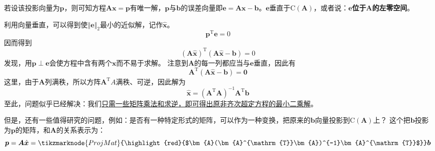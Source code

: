         若设该投影向量为$\bm{p}$，则可知方程$\bm{A}\bm{x}=\bm{p}$有唯一解，$\bm{p}$与$\bm{b}$的误差向量即$\bm{e}=\bm{A}\bm{x}-\bm{b}$。$\bm{e}$垂直于$\mathrm{C}(\bm{A})$，或者说：\textbf{$\bm{e}$位于$\bm{A}$的左零空间}。

        利用向量垂直，可以得到使$\left\Vert \bm{e}\right\Vert_2$最小的近似解，记作$\hat{\bm{x}}$。
        {\color{gray}
        \begin{equation}
            {\bm{p}^\mathrm{T}\bm{e}=0}
        \end{equation}
        {因而得到}
        \begin{equation*}
            {(\bm{A}\hat{\bm{x}})^{\mathrm{T}}(\bm{A}\hat{\bm{x}}-\bm{b})=0}
        \end{equation*}
        发现，用$\bm{p}\perp \bm{e}$会使方程中含有两个$\bm{x}$而不易于求解。}
        注意到$\bm{A}$的每一列都应当与$\bm{e}$垂直，因此有
        \begin{equation}
            \bm{A}^{\mathrm{T}}(\bm{A}\hat{\bm{x}}-\bm{b})=\bm{0}
        \end{equation}
        这里，由于$\bm{A}$列满秩，所以方阵$\bm{A}^{\mathrm{T}}A$满秩、可逆，因此解为
        \begin{equation}
            \hat{\bm{x}}=(\bm{A}^{\mathrm{T}}\bm{A})^{-1}\bm{A}^{\mathrm{T}} \bm{b}
        \end{equation}
        至此，问题似乎已经解决：我们\underline{只需一些矩阵乘法和求逆，即可得出原非齐次超定方程的最小二乘解}。

        但是，还有一些值得研究的问题，例如：是否有一种特定形式的矩阵，可以作为一种变换，把原来的$\bm{b}$向量投影到$\mathrm{C}(\bm{A})$上？
        这个把$\bm{b}$投影为$\bm{p}$的矩阵，和$\bm{A}$的关系表示为：
        \vspace{0.8cm}
        \begin{equation}
            \bm{p}
            =\bm{A}\hat{\bm{x}}
            =\tikzmarknode{ProjMat}{\highlight{red}{$\bm{A}(\bm{A}^{\mathrm{T}}\bm{A})^{-1}\bm{A}^{\mathrm{T}}$}} \bm{b}
        \end{equation}

